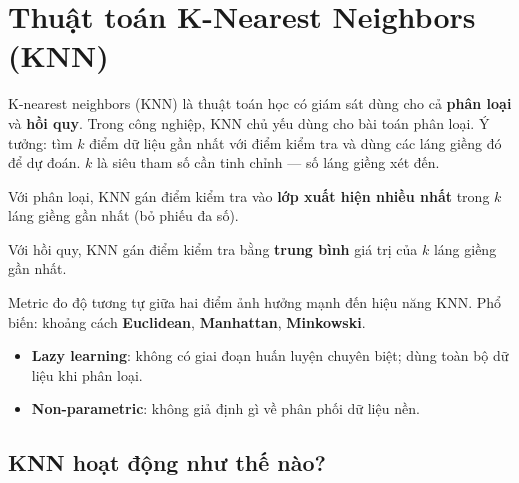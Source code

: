 \section{Thuật toán K-Nearest Neighbors (KNN)}
\label{sec:knn}

\begin{dinhnghia}[title={K-Nearest Neighbors (KNN)}]
K-nearest neighbors (KNN) là thuật toán học có giám sát dùng cho cả \textbf{phân loại} và \textbf{hồi quy}.
Trong công nghiệp, KNN chủ yếu dùng cho bài toán phân loại.
Ý tưởng: tìm $k$ điểm dữ liệu gần nhất với điểm kiểm tra và dùng các láng giềng đó để dự đoán.
$k$ là siêu tham số cần tinh chỉnh --- số láng giềng xét đến.
\end{dinhnghia}

\begin{phuongphap}[title={Phân loại}]
Với phân loại, KNN gán điểm kiểm tra vào \textbf{lớp xuất hiện nhiều nhất} trong $k$ láng giềng gần nhất (bỏ phiếu đa số).
\end{phuongphap}

\begin{phuongphap}[title={Hồi quy}]
Với hồi quy, KNN gán điểm kiểm tra bằng \textbf{trung bình} giá trị của $k$ láng giềng gần nhất.
\end{phuongphap}

\begin{dinhnghia}[title={Metric khoảng cách}]
Metric đo độ tương tự giữa hai điểm ảnh hưởng mạnh đến hiệu năng KNN.
Phổ biến: khoảng cách \textbf{Euclidean}, \textbf{Manhattan}, \textbf{Minkowski}.
\end{dinhnghia}

\begin{tinhchat}[title={Hai đặc tính định nghĩa KNN}]
\begin{itemize}
  \item \textbf{Lazy learning}: không có giai đoạn huấn luyện chuyên biệt; dùng toàn bộ dữ liệu khi phân loại.
  \item \textbf{Non-parametric}: không giả định gì về phân phối dữ liệu nền.
\end{itemize}
\end{tinhchat}

\subsection{KNN hoạt động như thế nào?}

